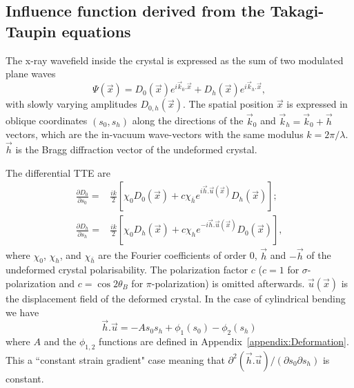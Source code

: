 \documentclass[preprint]{iucr}              %
\newcommand{\inred}[1]{{\color{red}#1}}
\begin{document}
\subsection{Influence function derived from the Takagi-Taupin equations}
\label{sec:influence}

The x-ray wavefield inside the crystal is expressed as the sum of two modulated plane waves
\begin{equation}
    \Psi(\vec x) = D_0(\vec x) e^{i \vec k_0 . \vec x} + D_h(\vec x) e^{i \vec k_h . \vec x},
\end{equation}
with slowly varying amplitudes $D_{0,h}(\vec x)$.
The spatial position $\vec x$ is expressed in oblique coordinates $(s_0,s_h)$ along the directions of the $\vec k_0$ and $\vec k_h=\vec k_0 + \vec h$ vectors\inred{, which are the in-vacuum wave-vectors with the same modulus $k=2\pi/\lambda$. $\vec{h}$ is the Bragg diffraction vector of the undeformed crystal.}

The differential TTE are
\begin{subequations}
\label{eq:TT}
\begin{align}
\frac{\partial D_0}{\partial s_0} =& \frac{ik}{2} \left[ \chi_0 D_0(\vec x)+c \chi_{\bar h} e^{i \vec h . \vec u (\vec x)} D_h(\vec x) \right]; \\
\frac{\partial D_h}{\partial s_h} =& \frac{ik}{2} \left[ \chi_0 D_h(\vec x)+c \chi_{h} e^{-i \vec h . \vec u (\vec x)} D_0(\vec x) \right],
\end{align}
\end{subequations}
where $\chi_0$, $\chi_h$, and $\chi_{\bar h}$ are the Fourier coefficients of order 0, $\vec h$ and $-\vec h$ of the undeformed crystal polarisability. The polarization factor $c$ ($c=1$ for $\sigma$-polarization and $c=\cos2\theta_B$  for $\pi$-polarization) \inred{is} omitted afterwards. 
$\vec u (\vec x)$ is the displacement field of the deformed crystal.
In the case of \inred{cylindrical bending we have}
\begin{equation}
\label{eq:cylinder}
    \vec h . \vec u = -A s_0 s_h + \phi_1(s_0) - \phi_2(s_h)
\end{equation}
where $A$ and the $\phi_{1,2}$ functions are \inred{defined} in Appendix~\ref{appendix:Deformation}.
This a 
``constant strain gradient" \inred{case} \cite{authierbook} meaning that $\partial^2(\vec h . \vec u)/(\partial s_0 \partial s_h)$ is constant.
\end{document}
